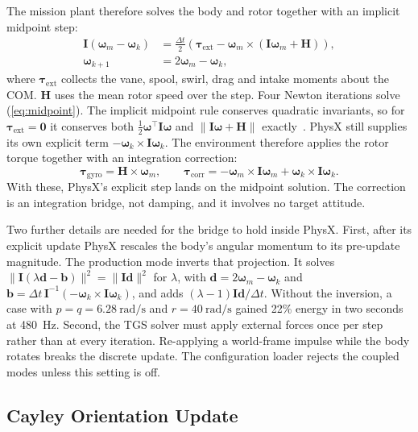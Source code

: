 \documentclass[journal]{IEEEtran}
\newcommand{\refeq}[1]{(\ref{#1})}
\newcommand{\vect}[1]{\bm{#1}}
\newcommand{\mat}[1]{\mathbf{#1}}
\newcommand{\wb}{\vect{\omega}}
\begin{document}
The mission plant therefore solves the body and rotor together with an implicit midpoint step:
\begin{equation}
\begin{split}
\mat{I}(\wb_m - \wb_k) &= \tfrac{\Delta t}{2}\left(\vect{\tau}_{\text{ext}} - \wb_m\times(\mat{I}\wb_m + \vect{H})\right),\\
\wb_{k+1} &= 2\wb_m - \wb_k ,
\end{split}
\label{eq:midpoint}
\end{equation}
where $\vect{\tau}_{\text{ext}}$ collects the vane, spool, swirl, drag and intake moments about the COM.
$\vect{H}$ uses the mean rotor speed over the step.
Four Newton iterations solve \refeq{eq:midpoint}.
The implicit midpoint rule conserves quadratic invariants, so for $\vect{\tau}_{\text{ext}} = \vect{0}$ it conserves both $\tfrac12\wb^\top\mat{I}\wb$ and $\|\mat{I}\wb + \vect{H}\|$ exactly~\cite{hairer2006}.
PhysX still supplies its own explicit term $-\wb_k\times\mat{I}\wb_k$.
The environment therefore applies the rotor torque together with an integration correction:
\begin{equation}
\vect{\tau}_{\text{gyro}} = \vect{H}\times\wb_m, \qquad
\vect{\tau}_{\text{corr}} = -\wb_m\times\mat{I}\wb_m + \wb_k\times\mat{I}\wb_k .
\label{eq:correction}
\end{equation}
With these, PhysX's explicit step lands on the midpoint solution.
The correction is an integration bridge, not damping, and it involves no target attitude.

Two further details are needed for the bridge to hold inside PhysX.
First, after its explicit update PhysX rescales the body's angular momentum to its pre-update magnitude.
The production mode inverts that projection.
It solves $\|\mat{I}(\lambda\vect{d} - \vect{b})\|^2 = \|\mat{I}\vect{d}\|^2$ for $\lambda$, with $\vect{d} = 2\wb_m - \wb_k$ and $\vect{b} = \Delta t\,\mat{I}^{-1}(-\wb_k\times\mat{I}\wb_k)$, and adds $(\lambda - 1)\mat{I}\vect{d}/\Delta t$.
Without the inversion, a case with $p = q = \SI{6.28}{\radian\per\second}$ and $r = \SI{40}{\radian\per\second}$ gained 22\% energy in two seconds at \SI{480}{\hertz}.
Second, the TGS solver must apply external forces once per step rather than at every iteration.
Re-applying a world-frame impulse while the body rotates breaks the discrete update.
The configuration loader rejects the coupled modes unless this setting is off.

\subsection{Cayley Orientation Update}
\label{sec:cayley}
\end{document}
